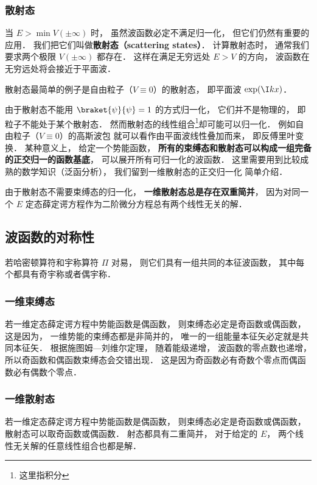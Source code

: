 \subsubsection{散射态}
当 $E > \min V(\pm\infty)$ 时， 虽然波函数必定不满足归一化， 但它们仍然有重要的应用． 我们把它们叫做\textbf{散射态（scattering states）}． 计算散射态时， 通常我们要求两个极限 $V(\pm \infty)$ 都存在． 这样在满足无穷远处 $E > V$ 的方向， 波函数在无穷远处将会接近于平面波．

散射态最简单的例子是自由粒子（$V\equiv 0$）的散射态， 即平面波 $\exp(\I kx)$．

由于散射态不能用 $\braket{\psi}{\psi} = 1$ 的方式归一化， 它们并不是物理的， 即粒子不能处于某个散射态． 然而散射态的线性组合\footnote{这里指积分}却可能可以归一化． 例如自由粒子（$V \equiv 0$）的高斯波包 就可以看作由平面波线性叠加而来， 即反傅里叶变换． 某种意义上， 给定一个势能函数， \textbf{所有的束缚态和散射态可以构成一组完备的正交归一的函数基底}， 可以展开所有可归一化的波函数． 这里需要用到比较成熟的数学知识（泛函分析）， 我们留到一维散射态的正交归一化 简单介绍．

由于散射态不需要束缚态的归一化， \textbf{一维散射态总是存在双重简并}， 因为对同一个 $E$ 定态薛定谔方程作为二阶微分方程总有两个线性无关的解．

\subsection{波函数的对称性}
若哈密顿算符和宇称算符 $\Pi$ 对易， 则它们具有一组共同的本征波函数， 其中每个都具有奇宇称或者偶宇称．

\subsubsection{一维束缚态}
若一维定态薛定谔方程中势能函数是偶函数， 则束缚态必定是奇函数或偶函数， 这是因为， 一维势能的束缚态都是非简并的， 唯一的一组能量本征矢必定就是共同本征矢． 根据施图姆—刘维尔定理， 随着能级递增， 波函数的零点数也递增， 所以奇函数和偶函数束缚态会交错出现． 这是因为奇函数必有奇数个零点而偶函数必有偶数个零点．

\subsubsection{一维散射态}
若一维定态薛定谔方程中势能函数是偶函数， 则束缚态必定是奇函数或偶函数， 散射态可以取奇函数或偶函数． 射态都具有二重简并， 对于给定的 $E$， 两个线性无关解的任意线性组合也都是解．

